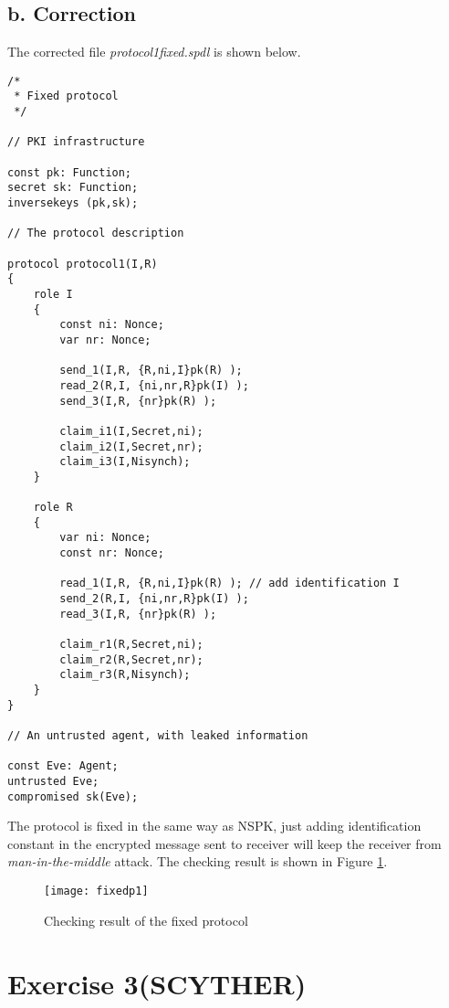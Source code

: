 \documentclass[a4paper, 12pt]{report}
\begin{document}
    \section*{b. Correction}
        The corrected file \emph{protocol1fixed.spdl} is shown below.
        \begin{lstlisting}[frame=single]
/* 
 * Fixed protocol
 */

// PKI infrastructure

const pk: Function;
secret sk: Function;
inversekeys (pk,sk);

// The protocol description

protocol protocol1(I,R)
{
	role I
	{
		const ni: Nonce;
		var nr: Nonce;

		send_1(I,R, {R,ni,I}pk(R) );
		read_2(R,I, {ni,nr,R}pk(I) );
		send_3(I,R, {nr}pk(R) );

		claim_i1(I,Secret,ni);
		claim_i2(I,Secret,nr);
		claim_i3(I,Nisynch);
	}

	role R
	{
		var ni: Nonce;
		const nr: Nonce;

		read_1(I,R, {R,ni,I}pk(R) ); // add identification I
		send_2(R,I, {ni,nr,R}pk(I) );
		read_3(I,R, {nr}pk(R) );

		claim_r1(R,Secret,ni);
		claim_r2(R,Secret,nr);
		claim_r3(R,Nisynch);
	}
}

// An untrusted agent, with leaked information

const Eve: Agent;
untrusted Eve;
compromised sk(Eve);
        \end{lstlisting}
        The protocol is fixed in the same way as NSPK, just adding identification constant in the encrypted message sent to receiver will keep the receiver from \emph{man-in-the-middle} attack. The checking result is shown in Figure \ref{fixedp1}.
    \begin{figure}[H]
        \centering
        \texttt{[image: fixedp1]}
        \caption{Checking result of the fixed protocol}
        \label{fixedp1}
    \end{figure}
\chapter* {Exercise 3(SCYTHER)}
%
\end{document}
